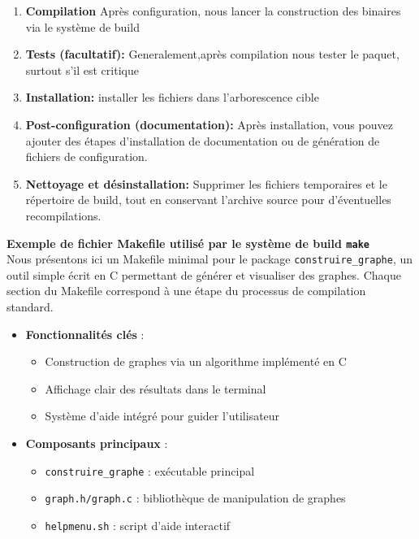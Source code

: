 \begin{enumerate}
  \item \textbf{Compilation}  
    Après configuration, nous lancer la construction des binaires via le
système de build 

  \item \textbf{Tests (facultatif):}  
     Generalement,après compilation nous tester le paquet, surtout s’il est critique
   
  
\item \textbf{Installation:}  
   installer les fichiers dans l’arborescence cible 

  \item \textbf{Post-configuration (documentation):}  
    Après installation, vous pouvez ajouter des étapes d'installation de documentation ou de génération de fichiers de configuration. 

  \item \textbf{Nettoyage et désinstallation:}  
    Supprimer les fichiers temporaires et le répertoire de
build, tout en conservant l’archive source pour d’éventuelles recompilations.
\end{enumerate}
\clearpage






\textbf{Exemple de fichier Makefile utilisé par le système de build \texttt{make}}\\
Nous présentons ici un Makefile minimal pour le package \texttt{construire\_graphe}, un outil simple écrit en C permettant de générer et visualiser des graphes. Chaque section du Makefile correspond à une étape du processus de compilation standard.

\begin{itemize}
  \item \textbf{Fonctionnalités clés} :
  \begin{itemize}
    \item Construction de graphes via un algorithme implémenté en C
    \item Affichage clair des résultats dans le terminal
    \item Système d’aide intégré pour guider l’utilisateur
  \end{itemize}

  \item \textbf{Composants principaux} :
  \begin{itemize}
    \item \texttt{construire\_graphe} : exécutable principal
    \item \texttt{graph.h/graph.c} : bibliothèque de manipulation de graphes
    \item \texttt{helpmenu.sh} : script d’aide interactif
  \end{itemize}
\end{itemize}


